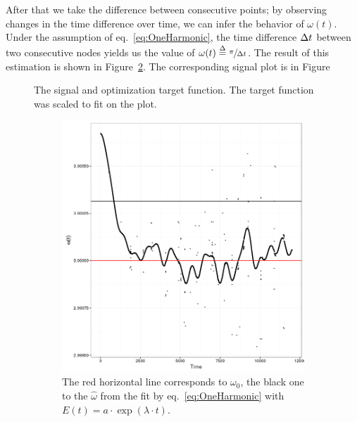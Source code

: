 \documentclass{article}
\newcommand{\deq}{\overset{\Delta}{=}}
\begin{document}
After that we take the difference between consecutive points; by observing changes in the time difference over time, we can infer the behavior of $\omega(t)$. Under the assumption of eq.~\eqref{eq:OneHarmonic}, the time difference $\dt$ between two consecutive nodes yields us the value of $\omega(t) \deq \sfrac{\pi}{\dt}$. The result of this estimation is shown in Figure~\ref{fig:WCreep_plot}. The corresponding signal plot is in Figure~
\begin{figure}[h]
	\centering
	\caption{The signal and optimization target function. The target function was scaled to fit on the plot.\label{fig:Optim_SglTgt}}
\end{figure}
\begin{figure}[h]
	\begin{subfigure}{.5\textwidth}
		\centering
		\includegraphics[scale=.5]{img/Signal/FreqCreep_W_plot}
		\caption{The red horizontal line corresponds to $\omega_0$, the black one to the $\hat{\omega}$ from the fit by eq.~\eqref{eq:OneHarmonic} with $E(t) = a\cdot \exp(\lambda\cdot t)$.\label{fig:WCreep_plot}}
	\end{subfigure}
	\begin{subfigure}{.5\textwidth}
		\centering

\end{subfigure}
\end{figure}
\end{document}
